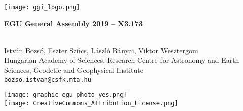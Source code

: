 \documentclass[a0, 18pt, landscape]{a0poster}
\begin{document}

\bfseries

\begin{minipage}{0.935\textwidth}
\begin{mdframed}[linecolor=black, linewidth=5pt, innerleftmargin=10pt, innerrightmargin=10pt, innertopmargin=25pt,
                 innerbottommargin=25pt, backgroundcolor=tcol, roundcorner=50pt]
    \hspace{10pt}
    \begin{minipage}[c]{0.08\textwidth}
        \texttt{[image: ggi\_logo.png]}
        \vspace{2.5pt}
        
        { \normalfont \bfseries EGU General Assembly 2019 -- X3.173 }
    \end{minipage}
    \begin{minipage}[c]{0.9\textwidth}
      \\[35pt] %
      {\Large István Bozsó, Eszter Szűcs, László Bányai, Viktor Wesztergom }\\[20pt]
     {\Large \normalfont Hungarian Academy of Sciences, Research Centre for Astronomy and Earth Sciences, Geodetic and Geophysical Institute}\\[25pt]
    {\Large \texttt{bozso.istvan@csfk.mta.hu}}
    \end{minipage}
\end{mdframed}
\end{minipage}
\hspace{15pt}
\begin{minipage}[c]{0.05\textwidth}
    \begin{center}
        \texttt{[image: graphic\_egu\_photo\_yes.png]}\\[10pt]
        \texttt{[image: CreativeCommons\_Attribution\_License.png]}
    \end{center}
\end{minipage}

\vspace{25pt}

\end{document}
